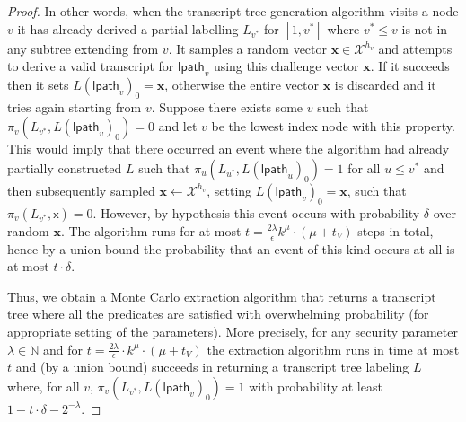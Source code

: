 \begin{proof}
In other words, when the transcript tree generation algorithm visits a node $v$ it has already derived a partial labelling $L_{v^*}$ for $[1,v^*]$ where $v^* ≤ v$ is not in any subtree extending from $v$. It samples a random vector $\mathbf{x} \in \mathcal{X}^{h_v}$ and attempts to derive a valid transcript for $\mathsf{lpath}_v$ using this challenge vector $\mathbf{x}$. If it succeeds then it sets $L(\mathsf{lpath}_v)_0 = \mathbf{x}$, otherwise the entire vector $\mathbf{x}$ is discarded and it tries again starting from $v$. Suppose there exists some $v$ such that $\pi_v(L_{v^*}, L(\mathsf{lpath}_v)_0) = 0$ and let $v$ be the lowest index node with this property.  This would imply that there occurred an event where the algorithm had already partially constructed $L$ such that $\pi_u(L_{u^*}, L(\mathsf{lpath}_u)_0) = 1$ for all $u \leq v^*$ and then subsequently sampled $\mathbf{x} \leftarrow \mathcal{X}^{h_v}$, setting $L(\mathsf{lpath}_v)_0 = \mathbf{x}$, such that $\pi_v(L_{v^*}, \mathsf{x}) = 0$. However, by hypothesis this event occurs with probability $\delta$ over random $\mathbf{x}$. The algorithm runs for at most $t = \frac{2\lambda}{\epsilon} k^\mu \cdot (\mu + t_V)$ steps in total, hence by a union bound the probability that an event of this kind occurs at all is at most $t \cdot \delta$. 

Thus, we obtain a Monte Carlo extraction algorithm that returns a transcript tree where all the predicates are satisfied with overwhelming probability (for appropriate setting of the parameters). More precisely, for any security parameter $\lambda \in \mathbb{N}$ and for $t = \frac{2\lambda}{\epsilon} \cdot k^\mu \cdot (\mu + t_V)$ the extraction algorithm runs in time at most $t$ and (by a union bound) succeeds in returning a transcript tree labeling $L$ where, for all $v$, $\pi_v(L_{v^*}, L(\mathsf{lpath}_v)_0) = 1$ with probability at least  $1 - t\cdot \delta - 2^{-\lambda}$.   %


 \end{proof}

 
